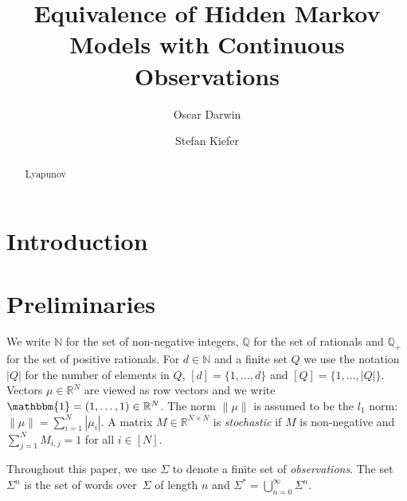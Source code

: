 \documentclass[a4paper,UKenglish,cleveref, autoref,mathscr]{lipics-v2019}
\title{Equivalence of Hidden Markov Models with Continuous Observations}
\author{Oscar Darwin}{Department of Computer Science, Oxford University, United Kingdom }{}{https://orcid.org/0000-0001-5016-014X}{}%
\author{Stefan Kiefer}{Department of Computer Science, Oxford University, United Kingdom}{}{https://orcid.org/0000-0003-4173-6877}{}
\newcommand{\RR}{\mathbb{R}}
\newcommand{\NN}{\mathbb{N}}
\newcommand{\QQ}{\mathbb{Q}}
\newcommand{\1}{\mathbbm{1}}
\begin{document}
\maketitle

\begin{abstract}
Lyapunov
\end{abstract}

\section{Introduction}


\section{Preliminaries}
We write $\NN$ for the set of non-negative integers, $\QQ$ for the set of rationals and $\QQ_+$ for the set of positive rationals.
For $d \in \NN$ and a finite set $Q$ we use the notation $|Q|$ for the number of elements in $Q$, $[d] = \{1, \dots, d\}$ and $[Q] = \{1, \dots, |Q|\}$. Vectors $\mu \in \RR^N$ are viewed as row vectors and we write $\1 = (1, \dots, 1) \in \RR^N$. The norm $\|\mu\|$ is assumed to be the $l_1$ norm: $\| \mu \| = \sum_{i = 1}^N | \mu_i |$.
A matrix $M \in \RR^{N \times N}$ is \emph{stochastic} if $M$ is non-negative and $\sum_{j = 1}^{N} M_{i,j} = 1$ for all $i \in [N]$.

Throughout this paper, we use $\Sigma$ to denote a finite set of \emph{observations}. The set $\Sigma^n$ is the set of words over~$\Sigma$ of length $n$ and $\Sigma^* = \bigcup_{n = 0}^\infty \Sigma^n$.
\end{document}
